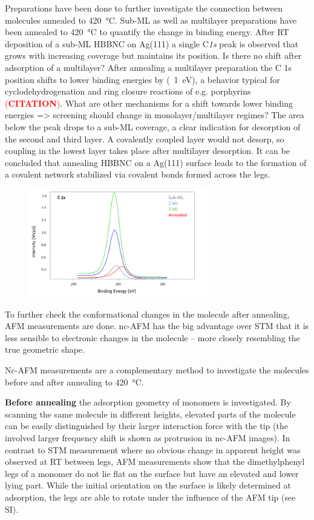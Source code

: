 Preparations have been done to further investigate the connection between molecules annealed to \SI{420}{\celsius}. Sub-ML as well as multilayer preparations have been annealed to \SI{420}{\celsius} to quantify the change in binding energy. After RT deposition of a sub-ML HBBNC on Ag(111) a single C\textit{1s} peak is observed that grows with increasing coverage but maintains its position.
Is there no shift after adsorption of a multilayer?
After annealing a multilayer preparation the C 1s position shifts to lower binding energies by (~\SI{1}{\eV}), a behavior typical for cyclodehydrogenation and ring closure reactions of e.g. porphyrins \textcolor{red}{(\textbf{CITATION})}. What are other mechanisms for a shift towards lower binding energies => screening should change in monolayer/multilayer regimes? The area below the peak drops to a sub-ML coverage, a clear indication for desorption of the second and third layer. A covalently coupled layer would not desorp, so coupling in the lowest layer takes place after multilayer desorption.
It can be concluded that annealing HBBNC on a Ag(111) surface leads to the formation of a covalent network stabilized via covalent bonds formed across the legs.

\begin{figure}[] \centering
	\includegraphics[width=0.7\textwidth]{./images/hbbnc-xps1}
	\caption{}
	\label{}
\end{figure}

To further check the conformational changes in the molecule after annealing, AFM measurements are done. nc-AFM has the big advantage over STM that it is less sensible to electronic changes in the molecule – more closely resembling the true geometric shape.

Nc-AFM measurements are a complementary method to investigate the molecules before and after annealing to \SI{420}{\celsius}. 

\textbf{Before annealing} the adsorption geometry of monomers is investigated. By scanning the same molecule in different heights, elevated parts of the molecule can be easily distinguished by their larger interaction force with the tip (the involved larger frequency shift is shown as protrusion in nc-AFM images). In contrast to STM measurement where no obvious change in apparent height was observed at RT between legs, AFM measurements show that the dimethylphenyl legs of a monomer do not lie flat on the surface but have an elevated and lower lying part. While the initial orientation on the surface is likely determined at adsorption, the legs are able to rotate under the influence of the AFM tip (see SI).

